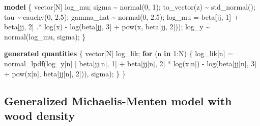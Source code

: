 \documentclass[
  12pt,
  letterpaper,
  DIV=11,
  numbers=noendperiod]{scrartcl}
\newenvironment{Shaded}{\begin{snugshade}}{\end{snugshade}}
\newcommand{\ControlFlowTok}[1]{\textcolor[rgb]{0.00,0.23,0.31}{\textbf{#1}}}
\newcommand{\DataTypeTok}[1]{\textcolor[rgb]{0.68,0.00,0.00}{#1}}
\newcommand{\DecValTok}[1]{\textcolor[rgb]{0.68,0.00,0.00}{#1}}
\newcommand{\FloatTok}[1]{\textcolor[rgb]{0.68,0.00,0.00}{#1}}
\newcommand{\KeywordTok}[1]{\textcolor[rgb]{0.00,0.23,0.31}{\textbf{#1}}}
\newcommand{\NormalTok}[1]{\textcolor[rgb]{0.00,0.23,0.31}{#1}}
\begin{document}
\begin{Shaded}
\begin{Highlighting}[]
\KeywordTok{model}\NormalTok{ \{}
  \DataTypeTok{vector}\NormalTok{[N] log\_mu;}
\NormalTok{  sigma \textasciitilde{} normal(}\DecValTok{0}\NormalTok{, }\DecValTok{1}\NormalTok{);}
\NormalTok{  to\_vector(z) \textasciitilde{} std\_normal();}
\NormalTok{  tau \textasciitilde{} cauchy(}\DecValTok{0}\NormalTok{, }\FloatTok{2.5}\NormalTok{);}
\NormalTok{  gamma\_hat \textasciitilde{} normal(}\DecValTok{0}\NormalTok{, }\FloatTok{2.5}\NormalTok{);}
\NormalTok{  log\_mu = beta[jj, }\DecValTok{1}\NormalTok{] + beta[jj, }\DecValTok{2}\NormalTok{] .* log(x) {-}}
\NormalTok{      log(beta[jj, }\DecValTok{3}\NormalTok{] + pow(x, beta[jj, }\DecValTok{2}\NormalTok{]));}
\NormalTok{  log\_y \textasciitilde{} normal(log\_mu, sigma);}
\NormalTok{\}}

\KeywordTok{generated quantities}\NormalTok{ \{}
  \DataTypeTok{vector}\NormalTok{[N] log\_lik;}
  \ControlFlowTok{for}\NormalTok{ (n }\ControlFlowTok{in} \DecValTok{1}\NormalTok{:N) \{}
\NormalTok{    log\_lik[n] = normal\_lpdf(log\_y[n] |}
\NormalTok{      beta[jj[n], }\DecValTok{1}\NormalTok{] +}
\NormalTok{      beta[jj[n], }\DecValTok{2}\NormalTok{] * log(x[n]) {-}}
\NormalTok{      log(beta[jj[n], }\DecValTok{3}\NormalTok{] + pow(x[n], beta[jj[n], }\DecValTok{2}\NormalTok{])),}
\NormalTok{      sigma);}
\NormalTok{  \}}
\NormalTok{\}}
\end{Highlighting}
\end{Shaded}

\newpage

\subsection{Generalized Michaelis-Menten model with wood
density}\label{generalized-michaelis-menten-model-with-wood-density}
\end{document}
